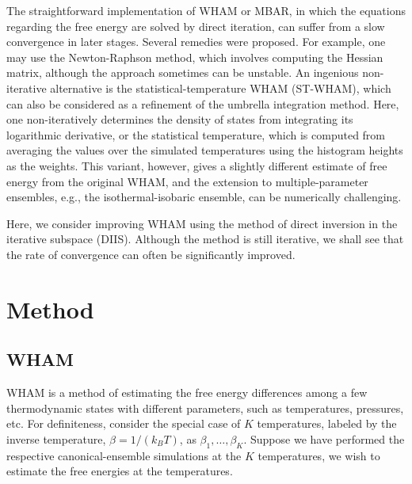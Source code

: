 \documentclass[reprint,superscriptaddress]{revtex4-1}
\begin{document}
The straightforward implementation of WHAM or MBAR,
in which the equations regarding the free energy
are solved by direct iteration,
can suffer from
a slow convergence in later stages.
%
Several remedies were proposed\cite{
shirts2008, bereau2009, kim2011}.
%
For example, one may use the Newton-Raphson method,
which involves computing the Hessian matrix,
although the approach sometimes can be unstable\cite{
shirts2008}.
%
An ingenious non-iterative alternative is
the statistical-temperature WHAM (ST-WHAM)\cite{
kim2011},
which can also be considered as a refinement of
the umbrella integration method\cite{
kastner2005}.
%
Here,
one non-iteratively determines the density of states
from integrating its logarithmic derivative,
or the statistical temperature,
which is computed from averaging the values
over the simulated temperatures
using the histogram heights as the weights.
%
This variant, however, gives
a slightly different estimate of free energy
from the original WHAM,
and the extension to multiple-parameter ensembles,
e.g., the isothermal-isobaric ensemble,
can be numerically challenging\cite{kim2011}.



Here, we consider improving WHAM using
the method of direct inversion in the iterative subspace (DIIS)\cite{
pulay1980, *pulay1982, *hamilton1986,
kovalenko1999, howard2011}.
%
Although the method is still iterative,
we shall see that
the rate of convergence can often be
significantly improved.





\section{Method}





\subsection{WHAM}



WHAM is a method of
estimating the free energy differences
among a few thermodynamic states
with different parameters,
such as temperatures, pressures, etc.
%
For definiteness,
consider the special case of $K$ temperatures,
labeled by the inverse temperature,
$\beta = 1/(k_B T)$,
as
$\beta_1, \ldots, \beta_K$.
%
Suppose we have performed the respective
canonical-ensemble simulations
at the $K$ temperatures,
we wish to estimate the free energies
at the temperatures.
\end{document}
